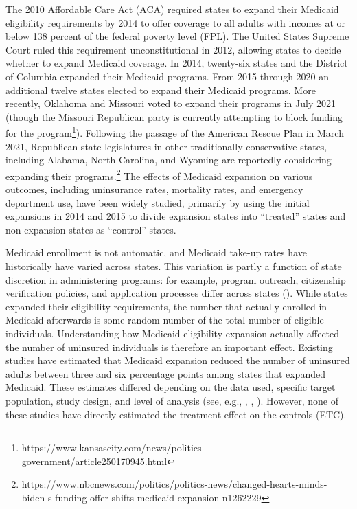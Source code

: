 The 2010 Affordable Care Act (ACA) required states to expand their Medicaid eligibility requirements by 2014 to offer coverage to all adults with incomes at or below 138 percent of the federal poverty level (FPL). The United States Supreme Court ruled this requirement unconstitutional in 2012, allowing states to decide whether to expand Medicaid coverage. In 2014, twenty-six states and the District of Columbia expanded their Medicaid programs. From 2015 through 2020 an additional twelve states elected to expand their Medicaid programs. More recently, Oklahoma and Missouri voted to expand their programs in July 2021 (though the Missouri Republican party is currently attempting to block funding for the program\footnote{https://www.kansascity.com/news/politics-government/article250170945.html}). Following the passage of the American Rescue Plan in March 2021, Republican state legislatures in other traditionally conservative states, including Alabama, North Carolina, and Wyoming are reportedly considering expanding their programs.\footnote{https://www.nbcnews.com/politics/politics-news/changed-hearts-minds-biden-s-funding-offer-shifts-medicaid-expansion-n1262229} The effects of Medicaid expansion on various outcomes, including uninsurance rates, mortality rates, and emergency department use, have been widely studied, primarily by using the initial expansions in 2014 and 2015 to divide expansion states into ``treated'' states and non-expansion states as ``control'' states. 

Medicaid enrollment is not automatic, and Medicaid take-up rates have historically have varied across states. This variation is partly a function of state discretion in administering programs: for example, program outreach, citizenship verification policies, and application processes differ across states (\cite{courtemanche2017early}). While states expanded their eligibility requirements, the number that actually enrolled in Medicaid afterwards is some random number of the total number of eligible individuals. Understanding how Medicaid eligibility expansion actually affected the number of uninsured individuals is therefore an important effect. Existing studies have estimated that Medicaid expansion reduced the number of uninsured adults between three and six percentage points among states that expanded Medicaid. These estimates differed depending on the data used, specific target population, study design, and level of analysis (see, e.g., \cite{kaestner2017effects}, \cite{courtemanche2017early}, \cite{frean2017premium}). However, none of these studies have directly estimated the treatment effect on the controls (ETC). 

